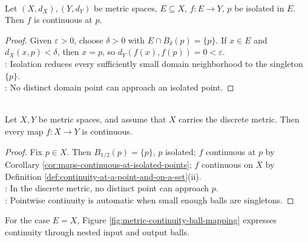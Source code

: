 \begin{corollary} \label{cor:maps-continuous-at-isolated-points} \\
Let $(X,d_X),(Y,d_Y)$ be metric spaces, $E\subseteq X$, $f:E\to Y$, $p$ be isolated in $E$. Then $f$ is continuous at $p$.
\begin{proof}
Given $\varepsilon>0$, choose $\delta>0$ with $E\cap B_\delta(p)=\{p\}$. If $x\in E$ and $d_X(x,p)<\delta$, then $x=p$, so $d_Y(f(x),f(p))=0<\varepsilon$.\\
: Isolation reduces every sufficiently small domain neighborhood to the singleton $\{p\}$.\\
: No distinct domain point can approach an isolated point.
\end{proof}
\end{corollary}

\begin{corollary} \label{cor:discrete-domain-maps-continuous} \\
Let $X,Y$ be metric spaces, and assume that $X$ carries the discrete metric. Then every map $f:X\to Y$ is continuous.
\begin{proof}
Fix $p\in X$. Then $B_{1/2}(p)=\{p\}$, $p$ isolated; $f$ continuous at $p$ by Corollary \ref{cor:maps-continuous-at-isolated-points}; $f$ continuous on $X$ by Definition \ref{def:continuity-at-a-point-and-on-a-set}(ii).\\
: In the discrete metric, no distinct point can approach $p$.\\
: Pointwise continuity is automatic when small enough balls are singletons.
\end{proof}
\end{corollary}

For the case $E=X$, Figure \ref{fig:metric-continuity-ball-mapping} expresses continuity through nested input and output balls.
\begin{illustrationfigure}[H]
  \centering
  
  \caption{Nested balls encode continuity at $x_0$ for $E=X$; adapted from \citet[Ch.~12, Fig.~12.2]{roman2008advanced}.}
  \label{fig:metric-continuity-ball-mapping}
\end{illustrationfigure}

